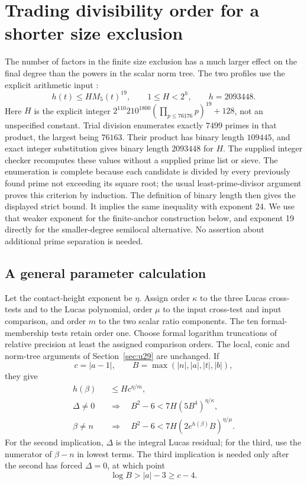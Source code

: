 \documentclass[11pt,a4paper]{article}
\theoremstyle{definition}
\theoremstyle{remark}
\begin{document}
\section{Trading divisibility order for a shorter size exclusion}
\label{sec:u29-height-cutoff}

The number of factors in the finite size exclusion has a much larger
effect on the final degree than the powers in the scalar norm tree.
The two profiles use the explicit arithmetic input
\cite[Theorem \texttt{thm:quartic-height19}]{RepositoryV9}:
\[
 h(t)\le H M_5(t)^{19},\qquad
 1\le H<2^h,\qquad h=2093448.
\]
Here $H$ is the explicit integer
$2^{110}210^{1800}(\prod_{p\le76176}p)^{19}+128$, not an
unspecified constant.  Trial division enumerates exactly $7499$
primes in that product, the largest being $76163$.  Their product
has binary length $109445$, and exact integer substitution gives
binary length $2093448$ for $H$.  The supplied integer checker
recomputes these values without a supplied prime list or sieve.
The enumeration is complete because each candidate is divided by
every previously found prime not exceeding its square root; the
usual least-prime-divisor argument proves this criterion by induction.
The definition of binary length then gives the displayed strict bound.
It implies the same inequality with exponent 24.  We use that weaker
exponent for the finite-anchor construction below, and exponent 19
directly for the smaller-degree semilocal alternative.  No assertion
about additional prime separation is needed.

\subsection{A general parameter calculation}

Let the contact-height exponent be $\eta$.  Assign order $\kappa$
to the three Lucas cross-tests and to the Lucas polynomial, order $\mu$
to the input cross-test and input comparison, and order $m$ to the two
scalar ratio components.  The ten formal-membership tests retain order
one.  Choose formal logarithm truncations of relative precision at least
the assigned comparison orders.  The local, conic and norm-tree
arguments of Section~\ref{sec:u29} are unchanged.  If
\[
 c=|a-1|,\qquad B=\max(|n|,|a|,|t|,|b|),
\]
they give
\begin{align}
 h(\beta)&\le Hc^{\eta/m},\label{eq:u29-general-scalar}\\
 \Delta\ne0\quad&\Longrightarrow\quad
 B^2-6<7H(5B^4)^{\eta/\kappa},\label{eq:u29-general-Lucas}\\
 \beta\ne n\quad&\Longrightarrow\quad
 B^2-6<7H(2e^{h(\beta)}B)^{\eta/\mu}.
 \label{eq:u29-general-input}
\end{align}
For the second implication, $\Delta$ is the integral Lucas residual;
for the third, use the numerator of $\beta-n$ in lowest terms.
The third implication is needed only after the second has forced
$\Delta=0$, at which point
\[
                         \log B>|a|-3\ge c-4.
\]
\end{document}
